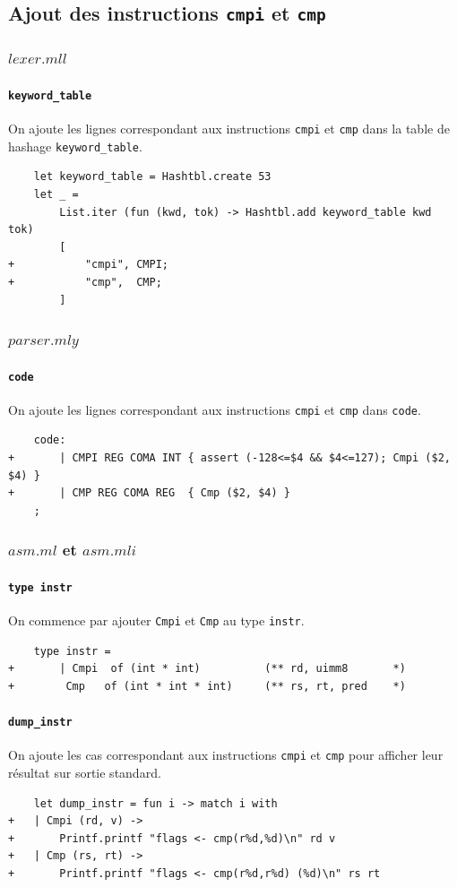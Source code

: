 \documentclass[11pt, a4paper, twoside, titlepage]{article}
\begin{document}
\subsection{Ajout des instructions \texttt{cmpi} et \texttt{cmp}}

\subsubsection{$lexer.mll$}
\paragraph{\texttt{keyword\_table}}
On ajoute les lignes correspondant aux instructions \texttt{cmpi} et \texttt{cmp} dans la table de hashage \texttt{keyword\_table}.
\begin{lstlisting}
	let keyword_table = Hashtbl.create 53
	let _ =
		List.iter (fun (kwd, tok) -> Hashtbl.add keyword_table kwd tok)
		[
+			"cmpi", CMPI;
+			"cmp",  CMP;
		]
\end{lstlisting}

\subsubsection{$parser.mly$}
\paragraph{\texttt{code}}
On ajoute les lignes correspondant aux instructions \texttt{cmpi} et \texttt{cmp} dans \texttt{code}.
\begin{lstlisting}
	code:
+		| CMPI REG COMA INT	{ assert (-128<=$4 && $4<=127); Cmpi ($2, $4) }
+		| CMP REG COMA REG	{ Cmp ($2, $4) }
	;
\end{lstlisting}

\subsubsection{$asm.ml$ et $asm.mli$}
\paragraph{\texttt{type instr}}
On commence par ajouter \texttt{Cmpi} et \texttt{Cmp} au type \texttt{instr}.
\begin{lstlisting}
	type instr =
+		| Cmpi  of (int * int)			(** rd, uimm8		*)
+		 Cmp   of (int * int * int)		(** rs, rt, pred	*)
\end{lstlisting}
\paragraph{\texttt{dump\_instr}}
On ajoute les cas correspondant aux instructions \texttt{cmpi} et \texttt{cmp} pour afficher leur résultat sur sortie standard.
\begin{lstlisting}
	let dump_instr = fun i -> match i with
+	| Cmpi (rd, v) ->
+		Printf.printf "flags <- cmp(r%d,%d)\n" rd v
+	| Cmp (rs, rt) ->
+		Printf.printf "flags <- cmp(r%d,r%d) (%d)\n" rs rt
\end{lstlisting}
\end{document}
